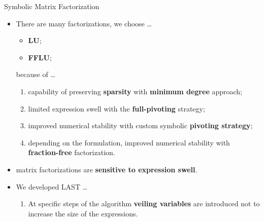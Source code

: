 \begin{frame}{Symbolic Matrix Factorization}
  \begin{itemize}
    \item There are many factorizations, we choose \dots
    \begin{itemize}
      \item \textbf{\ac{LU}};
      \item \textbf{\ac{FFLU}};
    \end{itemize}
    because of \dots
    \begin{enumerate}
      \item capability of preserving \textbf{sparsity} with \textbf{minimum degree} approach;
      \item limited expression swell with the \textbf{full-pivoting} strategy;
      \item improved numerical stability with custom symbolic \textbf{pivoting strategy};
      \item depending on the formulation, improved numerical stability with \textbf{fraction-free} factorization.
    \end{enumerate}
    \item \Maple{} matrix factorizations are \textbf{sensitive to expression swell}.
    \item We developed \ac{LAST} \dots
    \begin{enumerate}
      \item At specific steps of the algorithm \textbf{veiling variables} are introduced not to increase the size of the expressions.
    \end{enumerate}
  \end{itemize}
\end{frame}

